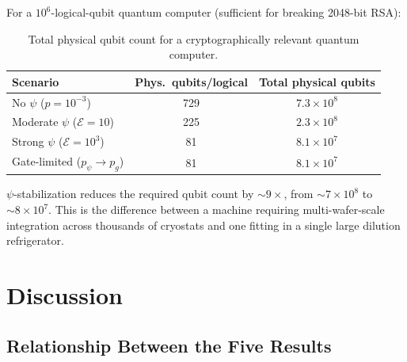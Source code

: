 \documentclass[aps,prl,twocolumn,superscriptaddress,nofootinbib,longbibliography]{revtex4-2}
\begin{document}
For a $10^6$-logical-qubit quantum computer (sufficient for breaking
2048-bit RSA):

\begin{table}[h]
\caption{Total physical qubit count for a cryptographically relevant
quantum computer.}
\label{tab:total}
\begin{ruledtabular}
\begin{tabular}{lcc}
Scenario & Phys.\ qubits/logical & Total physical qubits \\
\hline
No $\psi$ ($p = 10^{-3}$) & 729 & $7.3 \times 10^8$ \\
Moderate $\psi$ ($\mathcal{E} = 10$) & 225 & $2.3 \times 10^8$ \\
Strong $\psi$ ($\mathcal{E} = 10^3$) & 81 & $8.1 \times 10^7$ \\
Gate-limited ($p_\psi \to p_g$) & 81 & $8.1 \times 10^7$ \\
\end{tabular}
\end{ruledtabular}
\end{table}

$\psi$-stabilization reduces the required qubit count by
$\sim 9\times$, from $\sim 7 \times 10^8$ to $\sim 8 \times 10^7$.
This is the difference between a machine requiring multi-wafer-scale
integration across thousands of cryostats and one fitting in a
single large dilution refrigerator.

\section{Discussion}\label{sec:discussion}

\subsection{Relationship Between the Five Results}
\end{document}
